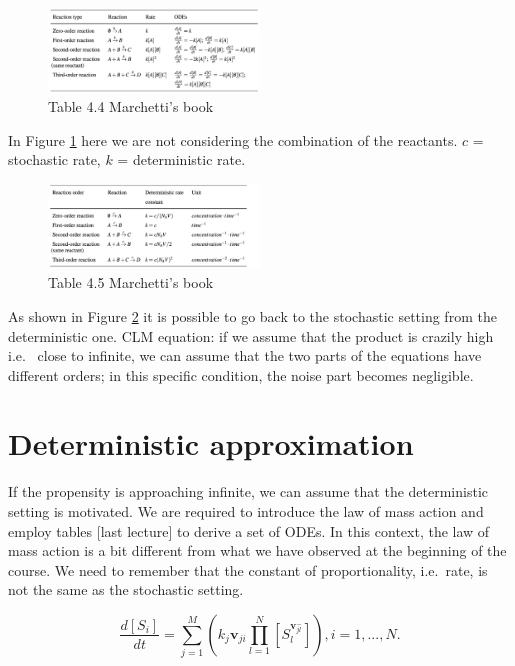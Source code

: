   \begin{figure}
    \centering
    \includegraphics[width=0.5\textwidth]{reaction_ODEs.png}
    \caption{Table 4.4 Marchetti's book}
    \label{fig:rec_ODE}
  \end{figure}

  \noindent
  In Figure \ref{fig:rec_ODE} here we are not considering the combination of the reactants.
  $c$ = stochastic rate, $k$ = deterministic rate.

  \begin{figure}
    \centering
    \includegraphics[width=0.5\textwidth]{reaction_rates.png}
    \caption{Table 4.5 Marchetti's book}
    \label{fig:rec_rates}
  \end{figure}

  \noindent
  As shown in Figure \ref{fig:rec_rates} it is possible to go back to the stochastic setting from the deterministic one.
  CLM equation: if we assume that the product is crazily high i.e. ~close to infinite, we can assume that the two parts of the equations have different orders; in this specific condition, the noise part becomes negligible.

\section{Deterministic approximation}
If the propensity is approaching infinite, we can assume that the deterministic setting is motivated.
We are required to introduce the law of mass action and employ tables {[}last lecture{]} to derive a set of ODEs.
In this context, the law of mass action is a bit different from what we have observed at the beginning of the course.
We need to remember that the constant of proportionality, i.e.~rate, is not the same as the stochastic setting.

$$ \frac{d[S_i]}{dt}= \sum^M_{j=1}( k_j\mathbf{v}_{ji}\prod^{N}_{l=1}{[S_l^{\mathbf{v}^{-}_{jl}}]}) ,i = 1,...,N.$$

